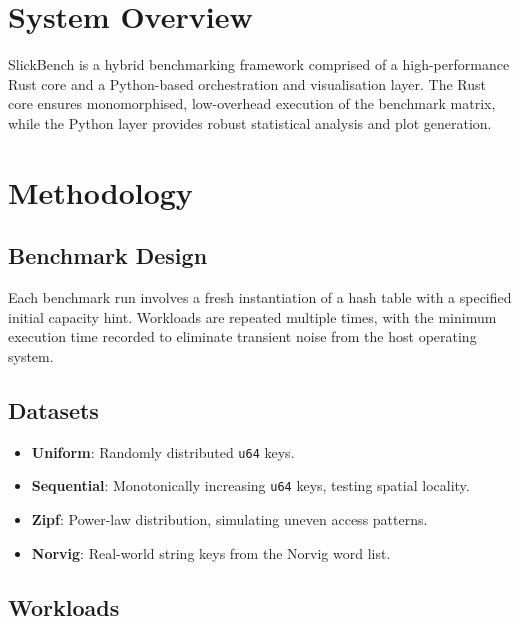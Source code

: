 \documentclass[11pt,a4paper]{article}
\begin{document}
\section{System Overview}

SlickBench is a hybrid benchmarking framework comprised of a high-performance Rust core and a Python-based orchestration and visualisation layer. The Rust core ensures monomorphised, low-overhead execution of the benchmark matrix, while the Python layer provides robust statistical analysis and plot generation.

\section{Methodology}

\subsection{Benchmark Design}

Each benchmark run involves a fresh instantiation of a hash table with a specified initial capacity hint. Workloads are repeated multiple times, with the minimum execution time recorded to eliminate transient noise from the host operating system.

\subsection{Datasets}

\begin{itemize}
  \item \textbf{Uniform}: Randomly distributed \texttt{u64} keys.
  \item \textbf{Sequential}: Monotonically increasing \texttt{u64} keys, testing spatial locality.
  \item \textbf{Zipf}: Power-law distribution, simulating uneven access patterns.
  \item \textbf{Norvig}: Real-world string keys from the Norvig word list.
\end{itemize}

\subsection{Workloads}
\end{document}
